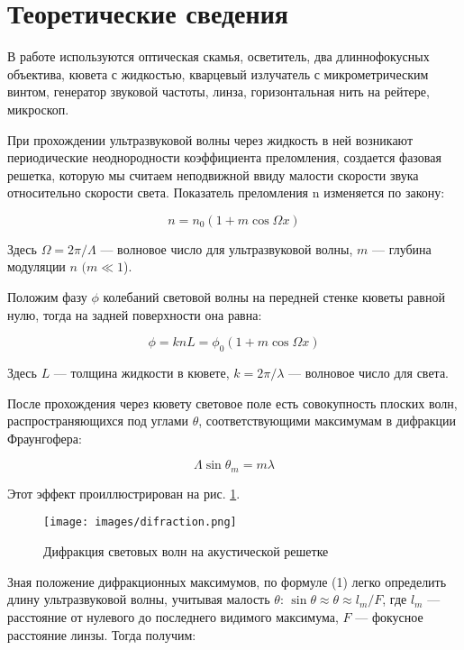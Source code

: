 \documentclass[a4paper,12pt]{article}
\begin{document}
\section{Теоретические сведения}

В работе используются оптическая скамья, осветитель, два длиннофокусных объектива, кювета с жидкостью, кварцевый излучатель с микрометрическим винтом, генератор звуковой частоты, линза, горизонтальная нить на рейтере, микроскоп. 
	
При прохождении ультразвуковой волны через жидкость в ней возникают периодические неоднородности коэффициента преломления, создается фазовая решетка, которую мы считаем неподвижной ввиду малости скорости звука относительно скорости света. Показатель
преломления n изменяется по закону:

\begin{equation}\label{}
    n = n_0 (1 + m \cos \Omega x)
\end{equation}

Здесь $ \Omega = 2 \pi / \Lambda $ --- волновое число для ультразвуковой волны, $ m $ --- глубина модуляции $ n $ $ (m \ll 1 $).

Положим фазу $ \phi $ колебаний световой волны на передней стенке кюветы равной нулю, тогда на задней поверхности она равна:

\begin{equation}\label{}
    \phi  = k n L = \phi_0 (1 + m \cos \Omega x)
\end{equation}

Здесь $ L $ --- толщина жидкости в кювете, $ k = 2 \pi / \lambda $ --- волновое число для света.

После прохождения через кювету световое поле есть совокупность плоских волн, распространяющихся под углами $ \theta $, соответствующими максимумам в дифракции Фраунгофера:

\begin{equation}\label{}	
    \Lambda \sin \theta_m = m \lambda
\end{equation}

Этот эффект проиллюстрирован на рис. \ref{pic:difraction}.
\begin{figure}[h!]
    \centering	
    \texttt{[image: images/difraction.png]}
    \caption{Дифракция световых волн на акустической решетке}
    \label{pic:difraction}
\end{figure}

Зная положение дифракционных максимумов, по формуле (1) легко определить длину ультразвуковой волны, учитывая малость $ \theta $: $ \sin \theta \approx \theta \approx l_m /F  $, где $ l_m $ --- расстояние от нулевого до последнего видимого максимума, $ F $ --- фокусное расстояние линзы. Тогда получим:
\end{document}
